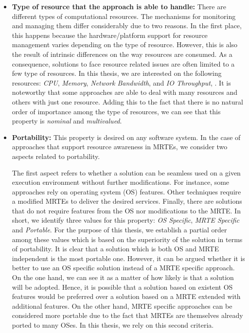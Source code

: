\begin{itemize}
\item\textbf{Type of resource that the approach is able to handle:}
There are different types of computational resources.
The mechanisms for monitoring and managing them differ considerably due to two reasons.
In the first place, this happens because the hardware/platform support for resource management varies depending on the type of resource.
However, this is also the result of intrinsic differences on the way resources are consumed.
As a consequence, solutions to face resource related issues are often limited to a few type of resources.
In this thesis, we are interested on the following resources: \textit{CPU}, \textit{Memory}, \textit{Network Bandwidth}, and \textit{IO Throughput}, .
It is noteworthy that some approaches are able to deal with many resources and others with just one resource.
Adding this to the fact that there is no natural order of importance among the type of resources, we can see that this property is \textit{nominal} and \textit{multivalued}.  

\item \textbf{Portability:}
This property is desired on any software system.
In the case of approaches that support resource awareness in MRTEs, we consider two aspects related to portability.

The first aspect refers to whether a solution can be seamless used on a given execution environment without further modifications.
For instance, some approaches rely on operating system (OS) features.
Other techniques require a modified MRTEs to deliver the desired services.
Finally, there are solutions that do not require features from the OS nor modifications to the MRTE.
In short, we identify three values for this property: \textit{OS Specific}, \textit{MRTE Specific} and \textit{Portable}.
For the purpose of this thesis, we establish a partial order among these values which is based on the superiority of the solution in terms of portability.
It is clear that a solution which is both OS and MRTE independent is the most portable one.
However, it can be argued whether it is better to use an OS specific solution instead of a MRTE specific approach.        
On the one hand, we can see it as a matter of how likely is that a solution will be adopted. 
Hence, it is possible that a solution based on existent OS features would be preferred over a solution based on a MRTE extended with additional features.
On the other hand, MRTE specific approaches can be considered more portable due to the fact that MRTEs are themselves already ported to many OSes.
In this thesis, we rely on this second criteria.


\end{itemize}
